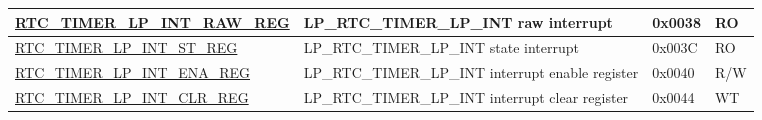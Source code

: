 \begin{longtable}{ | l | p{6cm} | p{1.3cm} | p{1.5cm} | }
\hyperref[regdesc:RTCTIMERLPINTRAWREG]{RTC\_TIMER\_LP\_INT\_RAW\_REG} & LP\_RTC\_TIMER\_LP\_INT raw interrupt & 0x0038 & RO \\ \hline
\hyperref[regdesc:RTCTIMERLPINTSTREG]{RTC\_TIMER\_LP\_INT\_ST\_REG} & LP\_RTC\_TIMER\_LP\_INT state interrupt & 0x003C & RO \\ \hline
\hyperref[regdesc:RTCTIMERLPINTENAREG]{RTC\_TIMER\_LP\_INT\_ENA\_REG} & LP\_RTC\_TIMER\_LP\_INT interrupt enable register & 0x0040 & R/W \\ \hline
\hyperref[regdesc:RTCTIMERLPINTCLRREG]{RTC\_TIMER\_LP\_INT\_CLR\_REG} & LP\_RTC\_TIMER\_LP\_INT interrupt clear register & 0x0044 & WT \\ \hline
\end{longtable}
